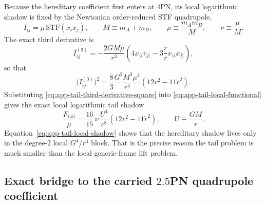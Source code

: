 \documentclass[11pt]{article}
\begin{document}
Because the hereditary coefficient first enters at $4$PN, its local logarithmic
shadow is fixed by the Newtonian order-reduced STF quadrupole,
\begin{equation}
I_{ij}
=
\mu\,\mathrm{STF}(x_i x_j),
\qquad
M\equiv m_A+m_B,
\qquad
\mu\equiv \frac{m_A m_B}{M},
\qquad
\nu\equiv \frac{\mu}{M}.
\label{eq:app-tail-newtonian-quadrupole}
\end{equation}
The exact third derivative is
\begin{equation}
I_{ij}^{(3)}
=
-
\frac{2GM\mu}{r^3}
\left(
4x_{\langle i}v_{j\rangle}
-
3\frac{\dot r}{r}x_{\langle i}x_{j\rangle}
\right),
\label{eq:app-tail-third-derivative}
\end{equation}
so that
\begin{equation}
\bigl(I_{ij}^{(3)}\bigr)^2
=
\frac{8}{3}\frac{G^2M^2\mu^2}{r^4}
\left(12v^2-11\dot r^2\right).
\label{eq:app-tail-third-derivative-square}
\end{equation}
Substituting \eqref{eq:app-tail-third-derivative-square} into
\eqref{eq:app-tail-local-functional} gives the exact local logarithmic tail
shadow
\begin{equation}
\boxed{
\frac{F_{\mathrm{tail}}}{\mu}
=
\frac{16}{15}\,\nu\,\frac{U^4}{c^8}
\left(12v^2-11\dot r^2\right),
\qquad
U\equiv \frac{GM}{r}.
}
\label{eq:app-tail-local-shadow}
\end{equation}
Equation~\eqref{eq:app-tail-local-shadow} shows that the hereditary shadow lives
only in the degree-$2$ local $G^4/r^4$ block.  That is the precise reason the
tail problem is much smaller than the local generic-frame lift problem.

\subsection{Exact bridge to the carried \texorpdfstring{$2.5$}{2.5}PN quadrupole coefficient}
\label{app:tail-exact-bridge}
\end{document}
